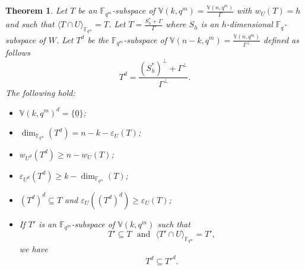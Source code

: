\documentclass[11pt]{amsart}
\newtheorem{theorem}{Theorem}[section]
\newcommand{\fqm}{\mathbb{F}_{q^m}}
\newcommand{\fq}{{\mathbb F}_{q}}
\begin{document}
\begin{theorem} \label{thm: dual defect}
Let  $T$ be an $\fqm$-subspace of $\mathbb{V}(k,q^m)=\frac{\mathbb{V}(n,q^m)}{\Gamma}$ with $w_{U}(T)=h$ and such that $\langle T \cap U \rangle_{\fqm}=T$. Let $T=\frac{S_h^*+\Gamma}{\Gamma}$ where $S_h$ is an $h$-dimensional $\fq$-subspace of $W$. Let $T^d$ be the $\fqm$-subspace of $\mathbb{V}(n-k,q^m)=\frac{\mathbb{V}(n,q^m)}{\Gamma^\perp}$ defined as follows
\begin{equation} \label{eq:T^d}
T^d= \frac{(S_h^*)^\perp+\Gamma^\perp}{\Gamma^\perp}.   \end{equation} 
The following hold:
\begin{itemize}
    \item[\bf 1.] $\mathbb{V}(k,q^m)^d=\{ \underline 0\}$;
    \item[\bf 2.]  $\dim_{\fqm} (T^d)=n-k-\varepsilon_{U}(T)$;
    \item[\bf 3.] $w_{U^d}(T^d)\geq n-w_{U}(T)$;
    \item[\bf 4.] $\varepsilon_{U^d}(T^d)\geq k- \dim_{\fqm} (T)$;
    \item[\bf 5.] $(T^d)^d \subseteq T$ and $\varepsilon_{U}((T^d)^d)\geq \varepsilon_{U}(T)$;
    \item[\bf 6.] If $T'$ is an $\fqm$-subspace of $\mathbb{V}(k,q^m)$ such that
    \[T'\subseteq T \,\,\,\, \mbox{and} \,\,\,\, \langle T' \cap U \rangle_{\fqm}=T',\]
we have
\[T^d\subseteq T'^d.\]
\end{itemize}
\end{theorem}
\end{document}
